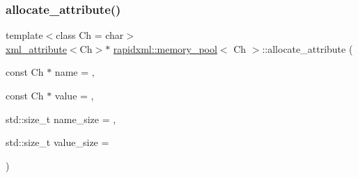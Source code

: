 \mbox{\label{classrapidxml_1_1memory__pool_a3de2a66c983336e006ea3844e244ed30}} 
\subsubsection{\texorpdfstring{allocate\_attribute()}{allocate\_attribute()}}
{\footnotesize\ttfamily template$<$class Ch  = char$>$ \\
\mbox{\hyperlink{classrapidxml_1_1xml__attribute}{xml\+\_\+attribute}}$<$Ch$>$$\ast$ \mbox{\hyperlink{classrapidxml_1_1memory__pool}{rapidxml\+::memory\+\_\+pool}}$<$ Ch $>$\+::allocate\+\_\+attribute (\begin{DoxyParamCaption}\item[{const Ch $\ast$}]{name = {},  }\item[{const Ch $\ast$}]{value = {},  }\item[{std\+::size\+\_\+t}]{name\+\_\+size = {},  }\item[{std\+::size\+\_\+t}]{value\+\_\+size = {} }\end{DoxyParamCaption})\hspace{0.3cm}{\ttfamily [inline]}}

